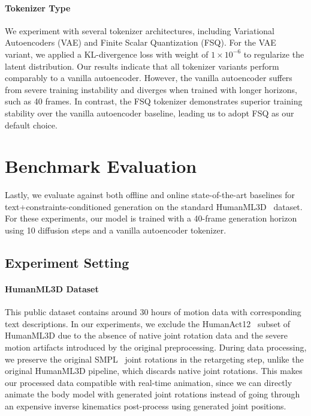 \paragraph{Tokenizer Type}
We experiment with several tokenizer architectures, including Variational Autoencoders (VAE) and Finite Scalar Quantization (FSQ). For the VAE variant, we applied a KL-divergence loss with weight of $1 \times 10^{-6}$ to regularize the latent distribution. Our results indicate that all tokenizer variants perform comparably to a vanilla autoencoder. 
However, the vanilla autoencoder suffers from severe training instability and diverges when trained with longer horizons, such as 40 frames. In contrast, the FSQ tokenizer demonstrates superior training stability over the vanilla autoencoder baseline, leading us to adopt FSQ as our default choice.

\section{Benchmark Evaluation}
\label{sec:results_compare}

Lastly, we evaluate \method against both offline and online state-of-the-art baselines for text+constraints-conditioned generation on the standard HumanML3D~\cite{guo2022humanml3d} dataset.
For these experiments, our model is trained with a 40-frame generation horizon using 10 diffusion steps and a vanilla autoencoder tokenizer.

\subsection{Experiment Setting}
\paragraph{HumanML3D Dataset}
This public dataset contains around 30 hours of motion data with corresponding text descriptions. In our experiments, we exclude the HumanAct12~\cite{guo2020action2motion} subset of HumanML3D due to the absence of native joint rotation data and the severe motion artifacts introduced by the original preprocessing.
During data processing, we preserve the original SMPL~\cite{SMPL:2015} joint rotations in the retargeting step, unlike the original HumanML3D pipeline, which discards native joint rotations. This makes our processed data compatible with real-time animation, since we can directly animate the body model with generated joint rotations instead of going through an expensive inverse kinematics post-process using generated joint positions.

